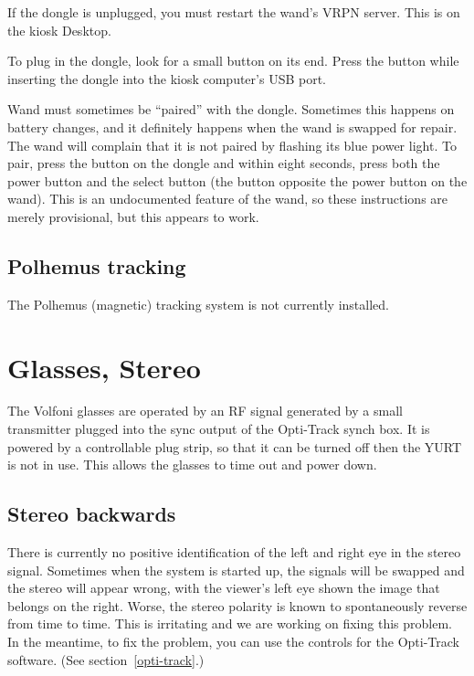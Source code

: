\documentclass[11pt]{article}
\newcommand{\yurt}{YURT\xspace}
\begin{document}
If the dongle is unplugged, you must restart the wand's VRPN server.
This is on the kiosk Desktop.


To plug in the dongle, look for a small button on its end.  Press the
button while inserting the dongle into the kiosk computer's USB port.

Wand must sometimes be ``paired'' with the dongle.  Sometimes this
happens on battery changes, and it definitely happens when the wand is
swapped for repair.  The wand will complain that it is not paired by
flashing its blue power light.  To pair, press the button on the
dongle and within eight seconds, press both the power button and the
select button (the button opposite the power button on the wand).  This is an
undocumented feature of the wand, so these instructions are merely
provisional, but this appears to work.


\subsection{Polhemus tracking}

The Polhemus (magnetic) tracking system is not currently installed.





\section{Glasses, Stereo}

The Volfoni glasses are operated by an RF signal generated by a small
transmitter plugged into the sync output of the Opti-Track synch box.
It is powered by a controllable plug strip, so that it can be turned
off then the \yurt is not in use.  This allows the glasses to time out
and power down.


\subsection{Stereo backwards}

There is currently no positive identification of the left and right
eye in the stereo signal.  Sometimes when the system is started
up, the signals will be swapped and the stereo will appear wrong, with
the viewer's left eye shown the image that belongs on the right.
Worse, the stereo polarity is known to spontaneously reverse from time to
time.  This is irritating and we are working on fixing this problem.
In the meantime, to fix the problem, you can use the controls for the
Opti-Track software.  (See section~\ref{opti-track}.)
\end{document}
